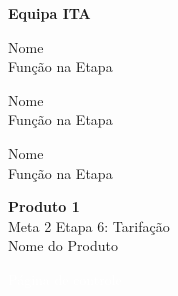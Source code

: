 \begin{pretextualblock}
\vspace*{2cm}    %
\begin{flushright}
	
	\textbf{Equipa ITA}\\
	\vspace*{1cm}
	
	Nome\\
	Função na Etapa\\
	\vspace*{1cm}
	
	Nome\\
	Função na Etapa\\
	\vspace*{1cm}
	
	Nome\\
	Função na Etapa\\
	\vspace*{1cm}

\end{flushright}


\newpage
\pagestyle{empty} 
\begin{flushleft}
	
\vspace*{15cm}	
\textcolor{airdataBlue}{\textbf{\LARGE Produto 1}}\\
\textcolor{airdataBlue}{Meta 2 \textbar{} Etapa 6: Tarifação}\\
\vspace*{5cm}	
Nome do Produto

\end{flushleft}
		
\newpage
\pagestyle{empty}      %
\textcolor{white}{Página de controle}
\newpage


\end{pretextualblock}

